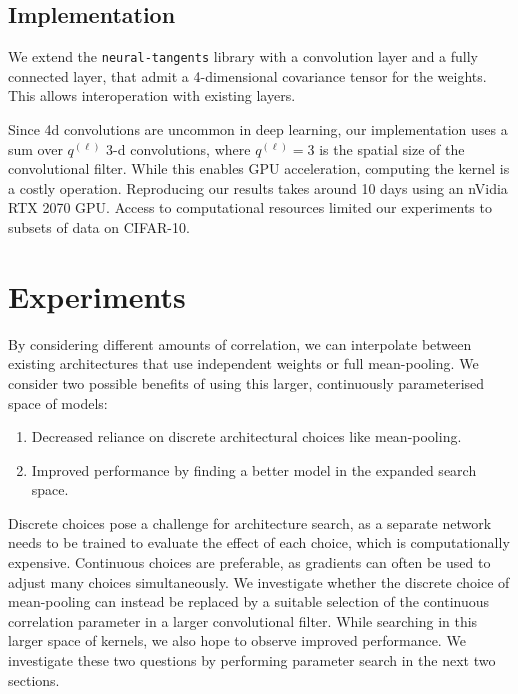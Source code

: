 \documentclass[accepted]{uai2021} %
\newcommand{\0}{\boldsymbol{0}}
\newcommand{\1}{\boldsymbol{1}}
\begin{document}
\subsection{Implementation}
We extend the \texttt{neural-tangents} \citep{neuraltangents2020} library with a convolution layer and a fully connected layer, that admit a 4-dimensional covariance tensor for the weights. This allows interoperation with existing layers.

Since 4d convolutions are uncommon in deep learning, our implementation uses a sum over $q^{(\ell)}$ 3-d convolutions, where $q^{(\ell)}=3$ is the spatial size of the convolutional filter. While this enables GPU acceleration, computing the kernel is a costly operation. Reproducing our results takes around 10 days using an nVidia RTX 2070 GPU. Access to computational resources limited our experiments to subsets of data on CIFAR-10.

\section{Experiments}
By considering different amounts of correlation, we can interpolate between existing architectures that use independent weights or full mean-pooling. We consider two possible benefits of using this larger, continuously parameterised space of models:
\begin{enumerate}[label=\textbf{\arabic*)}]
    \item Decreased reliance on discrete architectural choices like mean-pooling.
    \item Improved performance by finding a better model in the expanded search space.
\end{enumerate}

Discrete choices pose a challenge for architecture search, as a separate network needs to be trained to evaluate the effect of each choice, which is computationally expensive. Continuous choices are preferable, as gradients can often be used to adjust many choices simultaneously. We investigate whether the discrete choice of mean-pooling can instead be replaced by a suitable selection of the continuous correlation parameter in a larger convolutional filter. While searching in this larger space of kernels, we also hope to observe improved performance. We investigate these two questions by performing parameter search in the next two sections.
\end{document}
